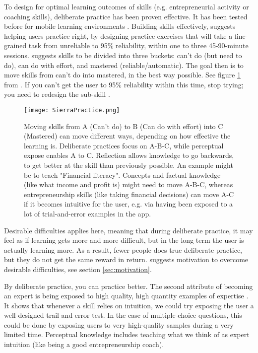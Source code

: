   To design for optimal learning outcomes of skills (e.g. entrepreneurial activity or coaching skills), deliberate practice has been proven effective. It has been tested before for mobile learning environments \citep{yengin}. Building skills effectively, \cite{sierra} suggests helping users practice right, by designing practice exercises that will take a fine-grained task from unreliable to 95\% reliability, within one to three 45-90-minute sessions. \cite{sierra} suggests skills to be divided into three buckets: can't do (but need to do), can do with effort, and mastered (reliable/automatic). The goal then is to move skills from can't do into mastered, in the best way possible. See figure \ref{fig:sierra-practice} from \cite{sierra}. If you can’t get the user to 95\% reliability within this time, stop trying; you need to redesign the sub-skill \citep{sierra}.

  \begin{figure}[h]
    \centering
    \texttt{[image: SierraPractice.png]}
    \caption{Moving skills from A (Can't do) to B (Can do with effort) into C (Mastered) can move different ways, depending on how effective the learning is. Deliberate practices focus on A-B-C, while perceptual expose enables A to C. Reflection allows knowledge to go backwards, to get better at the skill than previously possible. An example might be to teach "Financial literacy". Concepts and factual knowledge (like what income and profit is) might need to move A-B-C, whereas entrepreneurship skills (like taking financial decisions) can move A-C if it becomes intuitive for the user, e.g. via having been exposed to a lot of trial-and-error examples in the app.}
    \label{fig:sierra-practice}
  \end{figure}

  Desirable difficulties applies here, meaning that during deliberate practice, it may feel as if learning gets more and more difficult, but in the long term the user is actually learning more. As a result, fewer people does true deliberate practice, but they do not get the same reward in return. \cite{sierra} suggests motivation to overcome desirable difficulties, see section \ref{sec:motivation}.

  By deliberate practice, you can practice better. The second attribute of becoming an expert is being exposed to high quality, high quantity examples of expertise \citep{sierra}. It shows that whenever a skill relies on intuition, we could try exposing the user a well-designed trail and error test. In the case of multiple-choice questions, this could be done by exposing users to very high-quality samples during a very limited time. Perceptual knowledge includes teaching what we think of as expert intuition (like being a good entrepreneurship coach).

